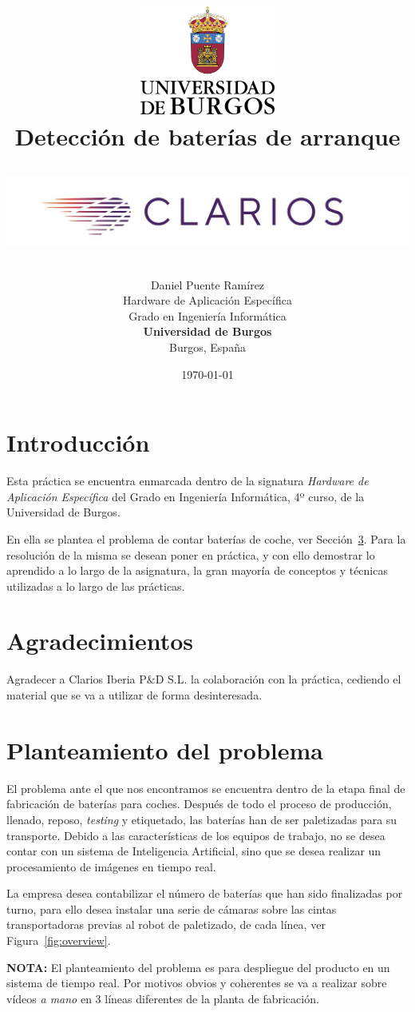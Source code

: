 \documentclass[11pt]{memoir}
\title{
\includegraphics[width=1.75in]{./img/Escudo.PNG} \\
\vspace*{1in}
\Huge\textbf{Detección de baterías de arranque} 

\includegraphics[width=\textwidth]{img/Clarios}}
\author{Daniel Puente Ramírez
		\vspace*{1.5in} \\
		Hardware de Aplicación Específica\\
		Grado en Ingeniería Informática\\
        \textbf{Universidad de Burgos}\\
        Burgos, España
       } \date{\today}
\begin{document}
\thispagestyle{empty}
\maketitle
\newpage
\thispagestyle{empty}
\tableofcontents
\thispagestyle{empty}
\newpage


\section{Introducción}
\setcounter{page}{1}
Esta práctica se encuentra enmarcada dentro de la signatura \textit{Hardware de Aplicación Específica} del Grado en Ingeniería Informática, 4º curso, de la Universidad de Burgos.

En ella se plantea el problema de contar baterías de coche, ver Sección~\ref{sec:problema}. Para la resolución de la misma se desean poner en práctica, y con ello demostrar lo aprendido a lo largo de la asignatura, la gran mayoría de conceptos y técnicas utilizadas a lo largo de las prácticas.

\vspace{5cm}
\section{Agradecimientos}
Agradecer a Clarios Iberia P$\&$D S.L. la colaboración con la práctica, cediendo el material que se va a utilizar de forma desinteresada. 
\newpage
\section{Planteamiento del problema}\label{sec:problema}
El problema ante el que nos encontramos se encuentra dentro de la etapa final de fabricación de baterías para coches. Después de todo el proceso de producción, llenado, reposo, \textit{testing} y etiquetado, las baterías han de ser paletizadas para su transporte. Debido a las características de los equipos de trabajo, no se desea contar con un sistema de Inteligencia Artificial, sino que se desea realizar un procesamiento de imágenes en tiempo real. 

La empresa desea contabilizar el número de baterías que han sido finalizadas por turno, para ello desea instalar una serie de cámaras sobre las cintas transportadoras previas al robot de paletizado, de cada línea, ver Figura~\ref{fig:overview}.

\textbf{NOTA:} El planteamiento del problema es para despliegue del producto en un sistema de tiempo real. Por motivos obvios y coherentes se va a realizar sobre vídeos \textit{a mano} en 3 líneas diferentes de la planta de fabricación. 
\end{document}
